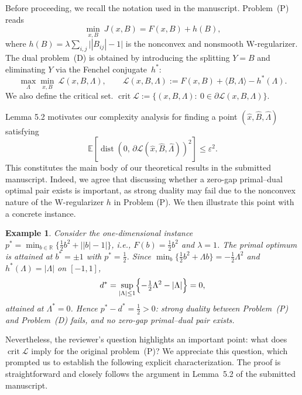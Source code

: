 \documentclass[11pt]{article}
\newtheorem{example}{Example}
\begin{document}
Before proceeding, we recall the
notation used in the manuscript. Problem~(P) reads
\[
\tag{P}
\min_{x,B}\ J(x,B)=F(x,B)+h(B),
\]
where $h(B)=\lambda\sum_{i,j}\bigl||B_{ij}|-1\bigr|$ is the nonconvex and
nonsmooth W-regularizer.
The dual problem~(D) is obtained by introducing the splitting $Y=B$
and eliminating $Y$ via the Fenchel conjugate~$h^*$:
\[
\max_{\Lambda}\min_{x,B}\
\mathcal{L}(x,B,\Lambda),\qquad
\mathcal{L}(x,B,\Lambda)
:=F(x,B)+\langle B,\Lambda\rangle-h^*(\Lambda).
\tag{D}
\]
We also define the critical set.
\(
\operatorname{crit}\mathcal{L}
:=\bigl\{(x,B,\Lambda):\
0\in\partial\mathcal{L}(x,B,\Lambda)\bigr\}.
\)

Lemma 5.2 motivates our complexity analysis for finding a point
$(\hat x,\widehat B,\widehat\Lambda)$ satisfying 
\[
\mathbb{E}[\operatorname{dist}(0,\,\partial\mathcal{L}(\hat x,\widehat B,\widehat\Lambda))^2]\le\varepsilon^2.
\]
This constitutes the main body of our theoretical results in the submitted manuscript. 
Indeed, we agree that discussing whether a zero-gap primal--dual optimal pair
exists is important, as strong duality may fail due to the nonconvex nature of
the W-regularizer $h$ in Problem (P). We then illustrate this point with a
concrete instance.

\begin{example}\label{ex:gap}
Consider the one-dimensional instance
$p^* = \min_{b\in\mathbb{R}}\bigl\{\tfrac12 b^2+\bigl||b|-1\bigr|\bigr\}$,
i.e., $F(b)=\tfrac12 b^2$ and $\lambda=1$. The primal optimum is attained at
$b^*=\pm1$ with $p^*=\tfrac12$. Since
$\min_b\{\tfrac12 b^2+\Lambda b\}=-\tfrac12\Lambda^2$ and
$h^*(\Lambda)=|\Lambda|$ on $[-1,1]$,
\[
d^*=\sup_{|\Lambda|\le1}\Bigl\{-\tfrac12\Lambda^2-|\Lambda|\Bigr\}=0,
\]
attained at $\Lambda^*=0$. Hence $p^*-d^*=\tfrac12>0$: strong duality
between Problem~(P) and Problem~(D) fails, and no zero-gap primal--dual pair exists.
\end{example}

Nevertheless, the reviewer's question highlights an important point: what does $\operatorname{crit}\mathcal{L}$ imply for the 
original problem~\textup{(P)}? We appreciate this question, which prompted
us to establish the following explicit characterization. The proof is straightforward and closely follows the argument in Lemma~5.2 of the submitted manuscript.
\end{document}
